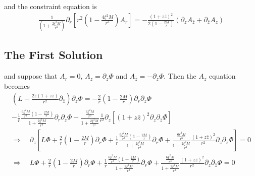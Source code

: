 \documentclass[12pt]{article}
\def\nn{\nonumber}
\begin{document}
and the constraint equation is
\begin{gather}
\frac{1}{(1 + \frac{2 \xi^{2} M}{r^{3}})}
\partial_{r}
\left[
r^{2}
(1 - \frac{4 \xi^{2} M}{r^{3}})
A_{r}
\right]
=
-\frac{(1 + z \bar{z})^{2}}{2 (1 - \frac{2 M}{r})}
(\partial_{z} A_{\bar{z}} + \partial_{\bar{z}} A_{z})
\end{gather}














\subsection{The First Solution}
and suppose that $A_{r} = 0$, $A_{z} = \partial_{z} \Phi$ and $A_{\bar{z}} = - \partial_{\bar{z}} \Phi$. Then the $A_{z}$ equation becomes
\begin{gather}
\left(L
-
\frac{2 \bar{z} (1 + z \bar{z})}{r^{2}}
\partial_{\bar{z}}
\right)
\partial_{z}
\Phi
=
-
\frac{2}{r}
(1 - \frac{2 M}{r})
\partial_{r} \partial_{z}
\Phi
\nn \\
-
\frac{1}{r}
\frac{\frac{6 \xi^{2} M}{r^{3}} (1 - \frac{2 M}{r}) }{1 + \frac{2 \xi^{2} M}{r^{3}}}
\partial_{r} \partial_{z}\Phi
-
\frac{\frac{6 \xi^{2} M}{r^{3}} }{1 + \frac{2 \xi^{2} M}{r^{3}}}
\frac{1}{r^{2}}
\partial_{z}
\left[
(1 + z \bar{z})^{2}
\partial_{z}\partial_{\bar{z}}\Phi
\right]
\nn \\
\Rightarrow
\quad
\partial_{z}
\left[
L
\Phi
+
\frac{2}{r}
(1 - \frac{2 M}{r})
\partial_{r}
\Phi
+
\frac{1}{r}
\frac{\frac{6 \xi^{2} M}{r^{3}} (1 - \frac{2 M}{r}) }{1 + \frac{2 \xi^{2} M}{r^{3}}}
\partial_{r} \Phi
+
\frac{\frac{6 \xi^{2} M}{r^{3}} }{1 + \frac{2 \xi^{2} M}{r^{3}}}
\frac{(1 + z \bar{z})^{2}}{r^{2}}
\partial_{z}\partial_{\bar{z}}\Phi
\right]
=0
\nn \\
\Rightarrow
\quad
L
\Phi
+
\frac{2}{r}
(1 - \frac{2 M}{r})
\partial_{r}
\Phi
+
\frac{1}{r}
\frac{\frac{6 \xi^{2} M}{r^{3}} (1 - \frac{2 M}{r}) }{1 + \frac{2 \xi^{2} M}{r^{3}}}
\partial_{r} \Phi
+
\frac{\frac{6 \xi^{2} M}{r^{3}} }{1 + \frac{2 \xi^{2} M}{r^{3}}}
\frac{(1 + z \bar{z})^{2}}{r^{2}}
\partial_{z}\partial_{\bar{z}}\Phi
=0
\label{FirstEquOne}
\end{gather}
\end{document}
